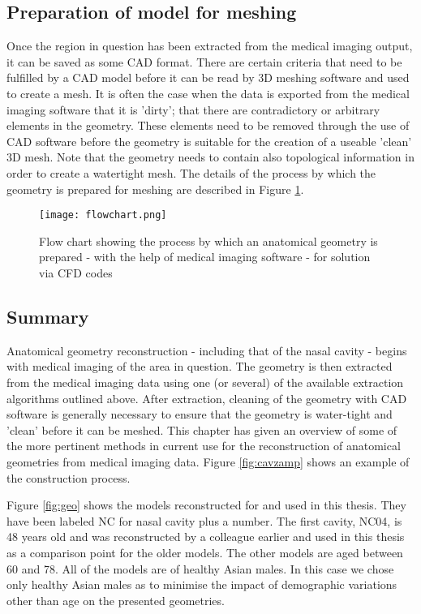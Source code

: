 \subsection{Preparation of model for meshing}

Once the region in question has been extracted from the medical imaging output, it can be saved as some CAD format. There are certain criteria that need to be fulfilled by a CAD model before it can be read by 3D meshing software and used to create a mesh. It is often the case when the data is exported from the medical imaging software that it is 'dirty'; that there are contradictory or arbitrary elements in the geometry. These elements need to be removed through the use of CAD software before the geometry is suitable for the creation of a useable 'clean' 3D mesh. Note that the geometry needs to contain also topological information in order to create a watertight mesh. The details of the process by which the geometry is prepared for meshing are described in Figure \ref{fig:segchart}.


\begin{figure}
  \texttt{[image: flowchart.png]}
\caption{Flow chart showing the process by which an anatomical geometry is prepared - with the help of medical imaging software - for solution via CFD codes} \label{fig:segchart}
\centering
\end{figure}
 
\subsection{Summary} 

Anatomical geometry reconstruction - including that of the nasal cavity - begins with medical imaging of the area in question. The geometry is then extracted from the medical imaging data using one (or several) of the available extraction algorithms outlined above. After extraction, cleaning of the geometry with CAD software is generally necessary to ensure that the geometry is water-tight and 'clean' before it can be meshed. This chapter has given an overview of some of the more pertinent methods in current use for the reconstruction of anatomical geometries from medical imaging data. Figure \ref{fig:cavzamp} shows an example of the construction process. 

Figure \ref{fig:geo} shows the models reconstructed for and used in this thesis. They have been labeled NC for nasal cavity plus a number. The first cavity, NC04, is 48 years old and was reconstructed by a colleague earlier and used in this thesis as a comparison point for the older models. The other models are aged between 60 and 78. All of the models are of healthy Asian males. In this case we chose only healthy Asian males as to minimise the impact of demographic variations other than age on the presented geometries.

